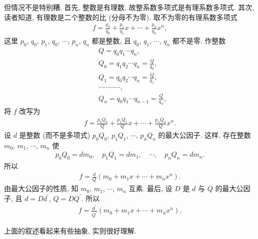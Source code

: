 但情况不是特别糟. 首先, 整数是有理数, 故整系数多项式是有理系数多项式. 其次, 读者知道, 有理数是二个整数的比 (分母不为零). 取不为零的有理系数多项式
\begin{align*}
    f = \frac{p_0}{q_0} + \frac{p_1}{q_1} x + \cdots + \frac{p_n}{q_n} x^n,
\end{align*}
这里 $p_0$, $q_0$, $p_1$, $q_0$, $\cdots$, $p_n$, $q_n$ 都是整数, 且 $q_0$, $q_1$, $\cdots$, $q_n$ 都不是零. 作整数
\begin{align*}
     & Q = q_0 q_1 \cdots q_n,                       \\
     & Q_0 = q_1 q_2 \cdots q_n = \frac{Q}{q_0},     \\
     & Q_1 = q_0 q_2 \cdots q_n = \frac{Q}{q_1},     \\
     & \cdots \cdots \cdots \cdots,                  \\
     & Q_n = q_0 q_1 \cdots q_{n-1} = \frac{Q}{q_n},
\end{align*}
将 $f$ 改写为
\begin{align*}
    f = \frac{p_0 Q_0}{Q} + \frac{p_1 Q_1}{Q} x + \cdots + \frac{p_n Q_n}{Q} x^n.
\end{align*}
设 $d$ 是整数 (而不是多项式) $p_0 Q_0$, $p_1 Q_1$, $\cdots$, $p_n Q_n$ 的最大公因子. 这样, 存在整数 $m_0$, $m_1$, $\cdots$, $m_n$ 使
\begin{align*}
    p_0 Q_0 = d m_0, \quad p_1 Q_1 = d m_1, \quad \cdots, \quad p_n Q_n = d m_n.
\end{align*}
所以
\begin{align*}
    f = \frac{d}{Q} (m_0 + m_1 x + \cdots + m_n x^n).
\end{align*}
由最大公因子的性质, 知 $m_0$, $m_1$, $\cdots$, $m_n$ 互素. 最后, 设 $D$ 是 $d$ 与 $Q$ 的最大公因子, 且 $d = Dd^{\prime}$, $Q = DQ^{\prime}$. 所以
\begin{align*}
    f = \frac{d^{\prime}}{Q^{\prime}} (m_0 + m_1 x + \cdots + m_n x^n).
\end{align*}

上面的叙述看起来有些抽象, 实则很好理解.

